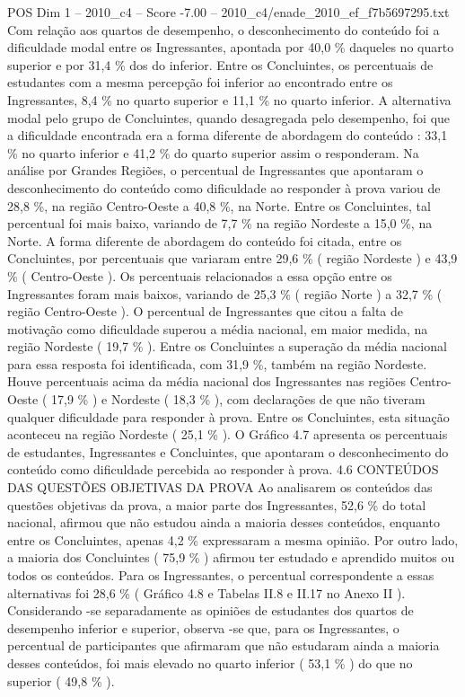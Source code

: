 \begin{textsample}{POS Dim 1 – 2010\_c4 – Score -7.00 – 2010\_c4/enade\_2010\_ef\_f7b5697295.txt}
Com relação aos quartos de desempenho, o desconhecimento do conteúdo foi a dificuldade modal entre os Ingressantes, apontada por 40,0 \% daqueles no quarto superior e por 31,4 \% dos do inferior.
Entre os Concluintes, os percentuais de estudantes com a mesma percepção foi inferior ao encontrado entre os Ingressantes, 8,4 \% no quarto superior e 11,1 \% no quarto inferior.
A alternativa modal pelo grupo de Concluintes, quando desagregada pelo desempenho, foi que a dificuldade encontrada era a forma diferente de abordagem do conteúdo : 33,1 \% no quarto inferior e 41,2 \% do quarto superior assim o responderam.
Na análise por Grandes Regiões, o percentual de Ingressantes que apontaram o desconhecimento do conteúdo como dificuldade ao responder à prova variou de 28,8 \%, na região Centro-Oeste a 40,8 \%, na Norte.
Entre os Concluintes, tal percentual foi mais baixo, variando de 7,7 \% na região Nordeste a 15,0 \%, na Norte.
A forma diferente de abordagem do conteúdo foi citada, entre os Concluintes, por percentuais que variaram entre 29,6 \% ( região Nordeste ) e 43,9 \% ( Centro-Oeste ).
Os percentuais relacionados a essa opção entre os Ingressantes foram mais baixos, variando de 25,3 \% ( região Norte ) a 32,7 \% ( região Centro-Oeste ).
O percentual de Ingressantes que citou a falta de motivação como dificuldade superou a média nacional, em maior medida, na região Nordeste ( 19,7 \% ).
Entre os Concluintes a superação da média nacional para essa resposta foi identificada, com 31,9 \%, também na região Nordeste.
Houve percentuais acima da média nacional dos Ingressantes nas regiões Centro-Oeste ( 17,9 \% ) e Nordeste ( 18,3 \% ), com declarações de que não tiveram qualquer dificuldade para responder à prova.
Entre os Concluintes, esta situação aconteceu na região Nordeste ( 25,1 \% ).
O Gráfico 4.7 apresenta os percentuais de estudantes, Ingressantes e Concluintes, que apontaram o desconhecimento do conteúdo como dificuldade percebida ao responder à prova. 4.6 CONTEÚDOS DAS QUESTÕES OBJETIVAS DA PROVA Ao analisarem os conteúdos das questões objetivas da prova, a maior parte dos Ingressantes, 52,6 \% do total nacional, afirmou que não estudou ainda a maioria desses conteúdos, enquanto entre os Concluintes, apenas 4,2 \% expressaram a mesma opinião.
Por outro lado, a maioria dos Concluintes ( 75,9 \% ) afirmou ter estudado e aprendido muitos ou todos os conteúdos.
Para os Ingressantes, o percentual correspondente a essas alternativas foi 28,6 \% ( Gráfico 4.8 e Tabelas II.8 e II.17 no Anexo II ).
Considerando -se separadamente as opiniões de estudantes dos quartos de desempenho inferior e superior, observa -se que, para os Ingressantes, o percentual de participantes que afirmaram que não estudaram ainda a maioria desses conteúdos, foi mais elevado no quarto inferior ( 53,1 \% ) do que no superior ( 49,8 \% ).

\end{textsample}
